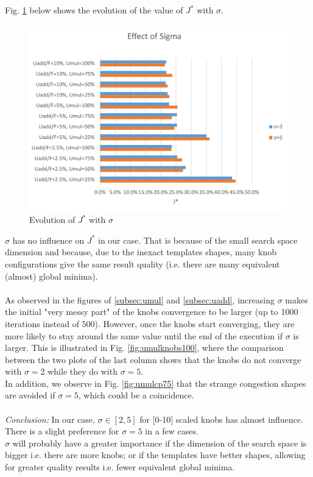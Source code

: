 Fig. \ref{fig:sigma} below shows the evolution of the value of $J^{*}$ with $\sigma$.\\
\begin{figure}[!h]
	\caption{Evolution of $J^{*}$ with $\sigma$}
	\label{fig:sigma}
	\includegraphics[width=7in]{figures/sigma.png}
\end{figure}
$\sigma$ has no influence on $J^{*}$ in our case. That is because of the small search space dimension and because, due to the inexact templates shapes, many knob configurations give the same result quality (i.e. there are many equivalent (almost) global minima).\\
\\
As observed in the figures of \ref{subsec:umul} and \ref{subsec:uadd}, increasing $\sigma$ makes the initial  "very messy part" of the knobs convergence to be larger (up to 1000 iterations instead of 500). However, once the knobs start converging, they are more likely to stay around the same value until the end of the execution if $\sigma$ is larger. This is illustrated in Fig. \ref{fig:umulknobs100}, where the comparison between the two plots of the last column shows that the knobs do not converge with $\sigma=2$ while they do with $\sigma=5$.\\
In addition, we observe in Fig. \ref{fig:umulcp75} that the strange congestion shapes are avoided if $\sigma=5$, which could be a coincidence.\\
\\
\emph{Conclusion:} In our case, $\sigma \in [2,5]$ for [0-10] scaled knobs has almost influence. There is a slight preference for $\sigma=5$ in a few cases. \\
$\sigma$ will probably have a greater importance if the dimension of the search space is bigger i.e. there are more knobs; or if the templates have better shapes, allowing for greater quality results i.e. fewer equivalent global minima.